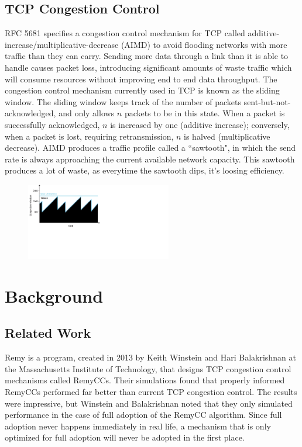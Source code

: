 \documentclass[conference]{IEEEtran}
\begin{document}
\subsection{TCP Congestion Control}
RFC 5681 specifies a congestion control mechanism for TCP called
additive-increase/multiplicative-decrease (AIMD) to avoid flooding networks with
more traffic than they can carry. Sending more data through a link than it is
able to handle causes packet loss, introducing significant amounts of waste
traffic which will consume resources without improving end to end data
throughput. The congestion control mechanism currently used in TCP is known as
the sliding window. The sliding window keeps track of the number of packets
sent-but-not-acknowledged, and only allows $n$ packets to be in this state. When
a packet is successfully acknowledged, $n$ is increased by one (additive
increase); conversely, when a packet is lost, requiring retransmission, $n$ is
halved (multiplicative decrease). AIMD produces a traffic profile called a
``sawtooth", in which the send rate is always approaching the current available
network capacity. This sawtooth produces a lot of waste, as everytime the
sawtooth dips, it's loosing efficiency. 
\begin{figure}[!t]
\centering
\includegraphics[width=2.5in]{AIMD}
\end{figure}


\section{Background}

\subsection{Related Work}
Remy is a program, created in 2013 by Keith Winstein and Hari Balakrishnan at
the Massachusetts Institute of Technology, that designs TCP congestion control
mechanisms called RemyCCs. Their simulations found that properly informed
RemyCCs performed far better than current TCP congestion control. The results
were impressive, but Winstein and Balakrishnan noted that they only simulated
performance in the case of full adoption of the RemyCC algorithm. Since full
adoption never happens immediately in real life, a mechanism that is only
optimized for full adoption will never be adopted in the first place.
\end{document}
